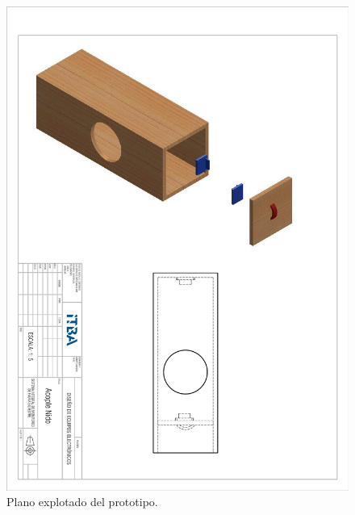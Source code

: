 \begin{figure}[H]
	\centering
	\includegraphics[width=\linewidth]{ImagenesApendice/explotado_nido}
	\caption{Plano explotado del prototipo.}
	\label{fig:explotado_nido_plano}
\end{figure}

